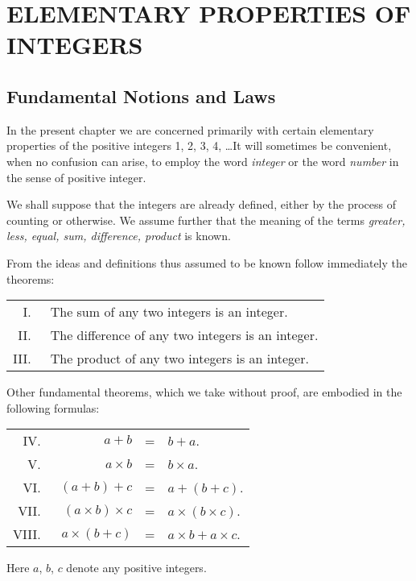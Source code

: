 \documentclass[oneside]{book}
\begin{document}
\mainmatter

\chapter{ELEMENTARY PROPERTIES OF INTEGERS}
\section{Fundamental Notions and Laws}\label{s1}%

In the present chapter we are concerned primarily with certain
elementary properties of the positive integers 1, 2, 3, 4, \ldots It
will sometimes be convenient, when no confusion can arise, to employ
the word \emph{integer} or the word \emph{number} in the sense of
positive integer.

We shall suppose that the integers are already defined, either by
the process of counting or otherwise. We assume further that the
meaning of the terms \emph{greater, less, equal, sum, difference,
product} is known.

From the ideas and definitions thus assumed to be known follow
immediately the theorems:
\begin{table}[h]
\begin{tabular}{rl}
    I.\ & The sum of any two integers is an integer. \\
   II.\ & The difference of any two integers is an integer. \\
  III.\ & The product of any two integers is an integer.
\end{tabular}
\end{table}

Other fundamental theorems, which we take without proof, are
embodied in the following formulas:
\begin{table}[h]
\begin{tabular}{rrcl}
  IV.\ &                 $a + b$ & = & $b + a$.                  \\
   V.\ &            $a \times b$ & = & $b \times a$.             \\
  VI.\ &           $(a + b) + c$ & = & $a + (b + c)$.            \\
 VII.\ & $(a \times b) \times c$ & = & $a \times (b \times c)$.  \\
VIII.\ &      $a \times (b + c)$ & = & $a \times b + a \times c$.
\end{tabular}
\end{table}
Here $a$, $b$, $c$ denote any positive integers.
\end{document}
